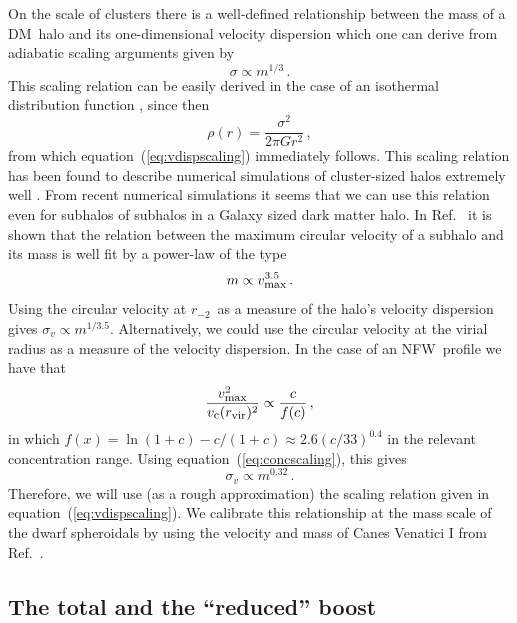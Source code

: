 \documentclass[aps,prd,twocolumn,amsmath,amssymb,floatfix,nofootinbib,10pt]{revtex4}
\newcommand{\NFW}{NFW}
\newcommand{\DM}{DM}
\newcommand{\eqnname}{equation}
\newcommand{\sigv}{\ensuremath{\sigma_v}}
\newcommand{\rminustwo}{\ensuremath{r_{-2}}}
\newcommand{\Rvir}{\ensuremath{r_{\mbox{{\footnotesize vir}}}}}
\newcommand{\vcirc}{\ensuremath{v_{\mbox{{\footnotesize c}}}}}
\newcommand{\vmax}{\ensuremath{v_{\mbox{{\footnotesize max}}}}}
\begin{document}
On the scale of clusters there is a well-defined relationship between
the mass of a \DM\ halo and its one-dimensional velocity dispersion
which one can derive from adiabatic scaling arguments
\cite{1998ApJ...495...80B} given by
\begin{equation}\label{eq:vdispscaling}
\sigma \propto m^{1/3}\, .
\end{equation}
This scaling relation can be easily derived in the case of an
isothermal distribution function \cite{2008gady.book.....B}, since
then
\begin{equation}
\rho(r) = \frac{\sigma^2}{2\pi G r^2}\, ,
\end{equation}
from which \eqnname\ (\ref{eq:vdispscaling}) immediately follows. This
scaling relation has been found to describe numerical simulations of
cluster-sized halos extremely well
\cite{1991ApJ...383...95E,1995MNRAS.275..720N,1995AJ....110...21C,1996ApJ...469..494E,1996MNRAS.281..716C,1998ApJ...495...80B}. From
recent numerical simulations it seems that we can use this relation
even for subhalos of subhalos in a Galaxy sized dark matter halo. In
Ref.~\cite{2008MNRAS.391.1685S} it is shown that the relation between
the maximum circular velocity of a subhalo and its mass is well fit by
a power-law of the type
\begin{equation}
m \propto \vmax^{3.5}\, .
\end{equation}
Using the circular velocity at \rminustwo\ as a measure of the halo's
velocity dispersion gives $\sigv \propto m^{1/3.5}$. Alternatively, we
could use the circular velocity at the virial radius as a measure of
the velocity dispersion. In the case of an \NFW\ profile we have that
\begin{equation}
\frac{\vmax^2}{\vcirc(\Rvir)^2} \propto \frac{c}{f(c)}\, ,
\end{equation}
in which $f(x) = \ln(1+c) - c/(1+c) \approx 2.6 (c/33)^{0.4}$ in the
relevant concentration range. Using \eqnname\ (\ref{eq:concscaling}),
this gives
\begin{equation}
\sigv \propto m^{0.32}\, .
\end{equation}
Therefore, we will use (as a rough approximation) the scaling relation
given in \eqnname\ (\ref{eq:vdispscaling}). We calibrate this
relationship at the mass scale of the dwarf spheroidals by using the
velocity and mass of Canes Venatici I from Ref.~\cite{2007ApJ...670..313S}.


\subsection{The total and the ``reduced'' boost}
\end{document}
